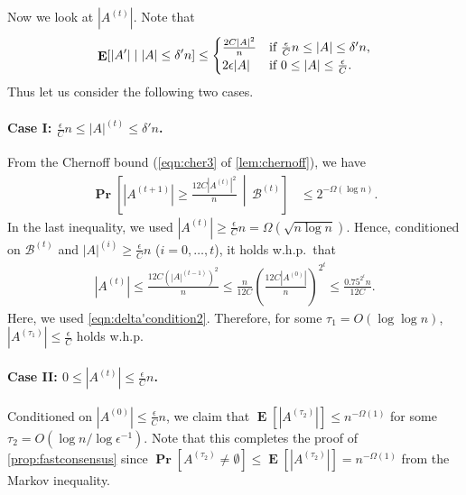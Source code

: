 \documentclass[letterpaper,11pt]{article}
\renewcommand\Pr{\mathop{\mathbf{Pr}}}
\DeclareMathOperator{\E}{\mathbf{E}}
\begin{document}
Now we look at $|A^{(t)}|$.
Note that
\begin{align*}
\E[|A'|\mid |A|\leq \delta' n] \leq 
\begin{cases}
\frac{2C|A|^2}{n} & \text{if $ \frac{\epsilon}{C}n \leq |A| \leq \delta'n$},\\
2\epsilon |A| & \text{if $0\leq |A| \leq \frac{\epsilon}{C}$}.
\end{cases}
\end{align*}
Thus let us consider the following two cases.
\paragraph*{Case I: $\frac{\epsilon}{C}n \leq |A|^{(t)} \leq \delta'n$.}
From the Chernoff bound (\ref{eqn:cher3} of \cref{lem:chernoff}), we have
\begin{align*}
\Pr\left[|A^{(t+1)}|\geq \frac{12C|A^{(t)}|^2}{n} \,\middle|\, \mathcal{B}^{(t)} \right]
&\leq 2^{-\Omega(\log n)}.
\end{align*}
In the last inequality, we used $|A^{(t)}|\geq \frac{\epsilon}{C} n = \Omega(\sqrt{n\log n})$.
Hence, conditioned on $\mathcal{B}^{(t)}$ and $|A|^{(i)}\geq \frac{\epsilon}{C}n$ ($i=0,\ldots,t$), it holds w.h.p.~that
\begin{align*}
|A^{(t)}| \leq \frac{12C (|A|^{(t-1)})^2}{n} \leq \frac{n}{12C}\left(\frac{12C |A^{(0)}|}{n}\right)^{2^t} \leq \frac{0.75^{2^t}n}{12C}.
\end{align*}
Here, we used \cref{eqn:delta'condition2}.
Therefore, for some $\tau_1=O(\log\log n)$, $|A^{(\tau_1)}| \leq \frac{\epsilon}{C}$ holds w.h.p.

\paragraph*{Case I\hspace{-.1em}I: $0\leq |A^{(t)}| \leq \frac{\epsilon}{C}n$.}
Conditioned on $|A^{(0)}| \leq \frac{\epsilon}{C}n$, we claim that $\E[|A^{(\tau_2)}|]\leq n^{-\Omega(1)}$ for some $\tau_2=O(\log n/\log \epsilon^{-1})$.
Note that this completes the proof of \cref{prop:fastconsensus} since $\Pr[A^{(\tau_2)}\neq \emptyset]\leq \E[|A^{(\tau_2)}|]=n^{-\Omega(1)}$ from the Markov inequality.
\end{document}

